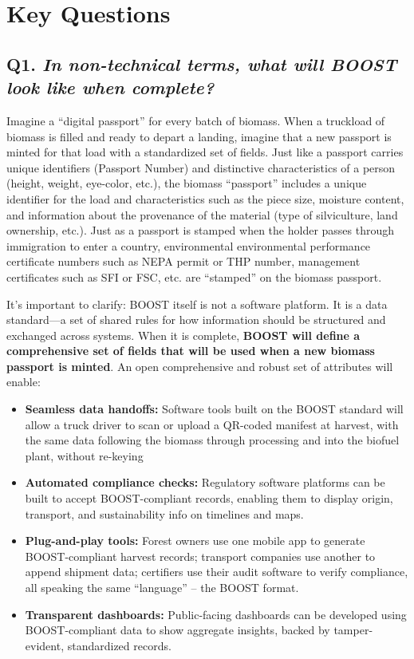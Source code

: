 \documentclass[title=small,preset=opensansnote,par=skip]{article}
\begin{document}
\section{Key Questions}
\label{sec:orgdefc32d}
\subsection{Q1. \emph{In non-technical terms, what will BOOST look like when complete?}}
\label{sec:org2264063}

Imagine a “digital passport” for every batch of biomass. When a truckload of biomass is filled and ready to depart a landing, imagine that a new passport is minted for that load with a standardized set of fields. Just like a passport carries unique identifiers (Passport Number) and distinctive characteristics of a person (height, weight, eye-color, etc.), the biomass “passport” includes a unique identifier for the load and characteristics such as the piece size, moisture content, and information about the provenance of the material (type of silviculture, land ownership, etc.). Just as a passport is stamped when the holder passes through immigration to enter a country, environmental environmental performance certificate numbers such as NEPA permit or THP number, management certificates such as SFI or FSC, etc. are “stamped” on the biomass passport.

It's important to clarify: BOOST itself is not a software platform. It is a data standard---a set of shared rules for how information should be structured and exchanged across systems. When it is complete, \textbf{BOOST will define a comprehensive set of fields that will be used when a new biomass passport is minted}. An open comprehensive and robust set of attributes will enable:

\begin{itemize}
\item \textbf{Seamless data handoffs:} Software tools built on the BOOST standard will allow a truck driver to scan or upload a QR-coded manifest at harvest, with the same data following the biomass through processing and into the biofuel plant, without re-keying

\item \textbf{Automated compliance checks:} Regulatory software platforms can be built to accept BOOST-compliant records, enabling them to display origin, transport, and sustainability info on timelines and maps.

\item \textbf{Plug-and-play tools:} Forest owners use one mobile app to generate BOOST-compliant harvest records; transport companies use another to append shipment data; certifiers use their audit software to verify compliance, all speaking the same “language” -- the BOOST format.

\item \textbf{Transparent dashboards:} Public-facing dashboards can be developed using BOOST-compliant data to show aggregate insights, backed by tamper-evident, standardized records.
\end{itemize}
\end{document}
